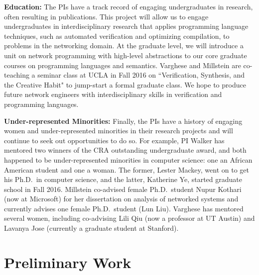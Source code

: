 {\bf Education:} 
The PIs have a track record of engaging undergraduates in research, often resulting in publications.  This project will allow us to engage undergraduates in interdisciplinary
research that applies programming language techniques, such as
automated verification and optimizing compilation, to problems in the networking domain.  At the graduate
level, we will introduce a unit on network programming with high-level
abstractions to our core
graduate courses on programming languages and semantics.  Varghese and Millstein are co-teaching a seminar class at UCLA in Fall 2016 on ``Verification, Synthesis, and the Creative Habit" to jump-start a formal graduate class.  We hope to
produce future network engineers with interdisciplinary skills in verification
and programming languages.

{\bf Under-represented Minorities:} Finally, the PIs have a history of engaging women and under-represented minorities in
their research projects and will continue to seek out opportunities to
do so.  For example, PI Walker has mentored two winners of the CRA
outstanding undergraduate award, and both happened to be
under-represented minorities in computer science: one an African
American student and one a woman.  The former, Lester Mackey, went
on to get his Ph.D.\ in computer science, and the latter, Katherine
Ye, started graduate school in Fall 2016.  Millstein co-advised female Ph.D.\ student Nupur Kothari (now at Microsoft) for her dissertation on analysis of networked systems and currently advises one female Ph.D.\ student (Lun Liu).  Varghese has mentored several women, including
co-advising Lili Qiu (now a professor at UT Austin) and Lavanya Jose (currently a graduate student at Stanford).


\section{Preliminary Work}
\label{sec:propane}


